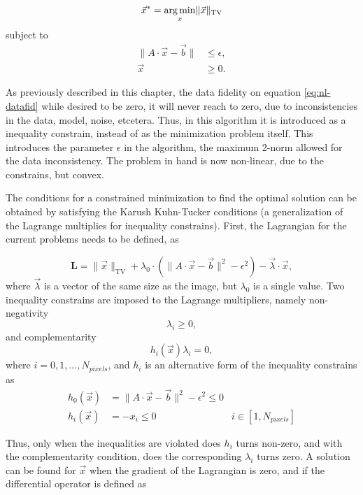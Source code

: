 \begin{equation}
\vec{x}^*= \mathop{\mathrm{arg\,min}}_x \lVert \vec{x} \rVert_\text{TV}
\end{equation}
subject to 
\begin{align}
\lVert A\cdot \vec{x}-\vec{b}\rVert &\leq \epsilon,\label{eq:nl-datafid}\\
\vec{x}&\geq 0.
\end{align}

As previously described in this chapter, the data fidelity on equation \ref{eq:nl-datafid} while desired to be zero, it will never reach to zero, due to inconsistencies in the data, model, noise, etcetera. Thus, in this algorithm it is introduced as a inequality constrain, instead of as the minimization problem itself. This introduces the parameter $\epsilon$ in the algorithm, the maximum 2-norm allowed for the data inconsistency. The problem in hand is now non-linear, due to the constrains, but convex.

The conditions for a constrained minimization to find the optimal solution can be obtained by satisfying the Karush Kuhn-Tucker conditions (a generalization of the Lagrange multiplies for inequality constrains). First, the Lagrangian for the current problems needs to be defined, as

\begin{equation}
\textbf{L}=\lVert \vec{x} \rVert_\text{TV}+\lambda_0\cdot(\lVert A\cdot \vec{x}-\vec{b}\rVert^2 - \epsilon^2)-\vec{\lambda}\cdot\vec{x},\label{eq:Lagrangian}
\end{equation}
where $\vec{\lambda}$ is a vector of the same size as the image, but $\lambda_0$ is a single value. Two inequality constrains are imposed to the Lagrange multipliers, namely non-negativity
\begin{equation}
\lambda_i \geq 0,
\end{equation}
and complementarity 
\begin{equation}
h_i(\vec{x}) \lambda_i = 0,
\end{equation}
where $i=0,1,..., N_{pixels}$, and $h_i$ is an alternative form of the inequality constrains as
\begin{align}
h_0(\vec{x}) &=\lVert A\cdot \vec{x}-\vec{b}\rVert^2 - \epsilon^2 \leq 0&\\
h_i(\vec{x}) &= -x_i \leq 0 & i \in [1, N_{pixels}]
\end{align}

Thus, only when the inequalities are violated does $h_i$ turns non-zero, and with the complementarity condition, does the corresponding $\lambda_i$ turns zero. A solution can be found for $\vec{x}$ when the gradient of the Lagrangian is zero, and if the differential operator is defined as

